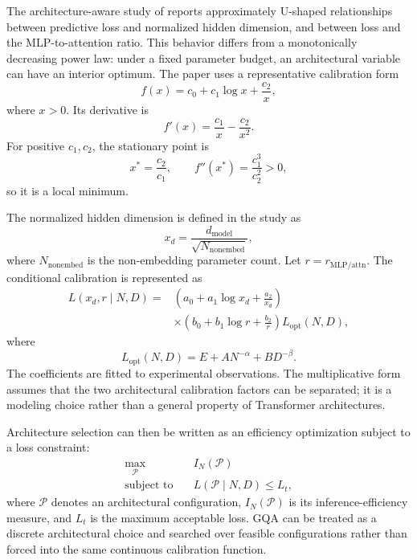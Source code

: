 The architecture-aware study of \textcite{Bian2026ArchitectureScaling}
reports approximately U-shaped relationships between predictive loss and
normalized hidden dimension, and between loss and the MLP-to-attention
ratio. This behavior differs from a monotonically decreasing power law:
under a fixed parameter budget, an architectural variable can have an
interior optimum. The paper uses a representative calibration form
\begin{equation}
    f(x)=c_0+c_1\log x+\frac{c_2}{x},
    \label{eq:scaling-architecture-u-shape}
\end{equation}
where \(x>0\). Its derivative is
\[
    f'(x)=\frac{c_1}{x}-\frac{c_2}{x^2}.
\]
For positive \(c_1,c_2\), the stationary point is
\begin{equation}
    x^*=\frac{c_2}{c_1},
    \qquad
    f''(x^*)=\frac{c_1^3}{c_2^2}>0,
    \label{eq:scaling-architecture-minimum}
\end{equation}
so it is a local minimum.

The normalized hidden dimension is defined in the study as
\begin{equation}
    x_d=
    \frac{d_{\mathrm{model}}}
         {\sqrt{N_{\mathrm{nonembed}}}},
    \label{eq:scaling-normalized-hidden-dimension}
\end{equation}
where \(N_{\mathrm{nonembed}}\) is the non-embedding parameter count. Let
\(r=r_{\mathrm{MLP/attn}}\). The conditional calibration is represented as
\begin{align}
    L(x_d,r\mid N,D)
    ={}&
    \left(a_0+a_1\log x_d+\frac{a_2}{x_d}\right)
    \nonumber\\
    &\times
    \left(b_0+b_1\log r+\frac{b_2}{r}\right)
    L_{\mathrm{opt}}(N,D),
    \label{eq:scaling-conditional-architecture-law}
\end{align}
where
\begin{equation}
    L_{\mathrm{opt}}(N,D)
    =
    E+AN^{-\alpha}+BD^{-\beta}.
    \label{eq:scaling-architecture-reference-loss}
\end{equation}
The coefficients are fitted to experimental observations. The multiplicative
form assumes that the two architectural calibration factors can be separated;
it is a modeling choice rather than a general property of Transformer
architectures.

Architecture selection can then be written as an efficiency optimization
subject to a loss constraint:
\begin{equation}
    \begin{aligned}
        \max_{\mathcal{P}}\quad & I_N(\mathcal{P})\\
        \text{subject to}\quad
        &L(\mathcal{P}\mid N,D)\leq L_t,
    \end{aligned}
    \label{eq:scaling-architecture-optimization}
\end{equation}
where \(\mathcal{P}\) denotes an architectural configuration,
\(I_N(\mathcal{P})\) is its inference-efficiency measure, and \(L_t\) is
the maximum acceptable loss. GQA can be treated as a discrete architectural
choice and searched over feasible configurations rather than forced into
the same continuous calibration function.

